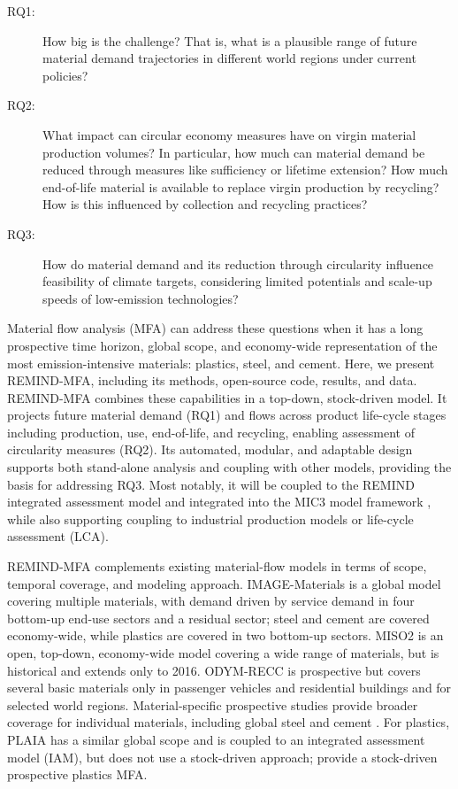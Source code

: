\documentclass[pdflatex]{sn-jnl}
\begin{document}
\begin{description}
	\item[RQ1:] How big is the challenge? That is, what is a plausible range of future material demand trajectories in different world regions under current policies?
	\item[RQ2:] What impact can circular economy measures have on virgin material production volumes? In particular, how much can material demand be reduced through measures like sufficiency or lifetime extension? How much end-of-life material is available to replace virgin production by recycling? How is this influenced by collection and recycling practices?
	\item[RQ3:] How do material demand and its reduction through circularity influence feasibility of climate targets, considering limited potentials and scale-up speeds of low-emission technologies?
\end{description}

Material flow analysis (MFA) can address these questions when it has a long prospective time horizon, global scope, and economy-wide representation of the most emission-intensive materials: plastics, steel, and cement. Here, we present REMIND-MFA, including its methods, open-source code, results, and data. REMIND-MFA combines these capabilities in a top-down, stock-driven model. It projects future material demand (RQ1) and flows across product life-cycle stages including production, use, end-of-life, and recycling, enabling assessment of circularity measures (RQ2). Its automated, modular, and adaptable design supports both stand-alone analysis and coupling with other models, providing the basis for addressing RQ3. Most notably, it will be coupled to the REMIND integrated assessment model \parencite{ludererREMINDREgionalModel2025} and integrated into the MIC3 model framework \parencite{transienceconsortiumMIC3Platform2026}, while also supporting coupling to industrial production models or life-cycle assessment (LCA).

REMIND-MFA complements existing material-flow models in terms of scope, temporal coverage, and modeling approach. IMAGE-Materials \parencite{arp2026,arp2026a} is a global model covering multiple materials, with demand driven by service demand in four bottom-up end-use sectors and a residual sector; steel and cement are covered economy-wide, while plastics are covered in two bottom-up sectors. MISO2 \parencite{wiedenhoferExtractionEndusesWaste2024} is an open, top-down, economy-wide model covering a wide range of materials, but is historical and extends only to 2016. ODYM-RECC \parencite{pauliukLinkingServiceProvision2021b} is prospective but covers several basic materials only in passenger vehicles and residential buildings and for selected world regions. Material-specific prospective studies provide broader coverage for individual materials, including global steel \parencite{pauliuk2013b} and cement \parencite{cao2020}. For plastics, PLAIA \parencite{stegmannPlasticFuturesTheir2022a} has a similar global scope and is coupled to an integrated assessment model (IAM), but does not use a stock-driven approach; \textcite{gaoEvaluatingPotentialReduce2025} provide a stock-driven prospective plastics MFA.
\end{document}
